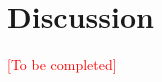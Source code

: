 \section{Discussion}

\textcolor{red}{[To be completed]}

\begin{comment}
Depends on what the nature of your study was, but you might either leave the reader with design recommendations for the context you studied (e.g., how could HCI address the lives of young women in rural West Bengal facing constant threats to their safety) or else discuss the main takeaways for your desired readers of this paper (ICTD researchers? Other HCI researchers? Practitioners?). This needs thought and work. You need a week just to think about and iterate on the Discussion. Do not take this lightly. If you are taking on a particular theoretical lens, you will need to deeply engage with this lens through the Discussion. 
\end{comment}

\begin{comment}
How ethics play a role? How to still reach target

Class + socio-economic: look at references for class

Designing services and challenges involved, how to ensure services are adopted?

Design recommendations -
Waiting time - ICTD paper 
Info factor, how it is provided eg morning, location
Sustainability of the intervention

Factors leading to what is overlooked and say stuff was overlooked
Extending the service to other 

What were the Design objectives?
How can we check if they are met
Collecting the right data
 
Time factor - why is it that time when people are working
Perspective of ppl who are coming, not coming, drs - cannot say that they are not coming, cannot conclusively cannot say that middle income are coming. There’s a gap - how can you close the gap further - how to make it more effective?

Is there a motivation for them to go to a clinic 

Collecting better data to assess interventions - data that is easy to collect 
Other aspect: how do you share info about the intervention - info gap, social gap
Footfall track to monitor for number of ppl coming to the clinic
Incentives to stay engaged
\end{comment}


